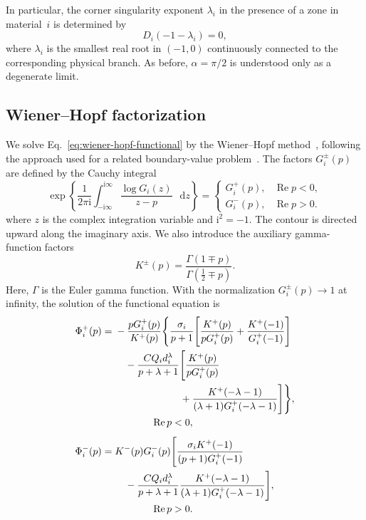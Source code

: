 \documentclass[pdflatex,iicol,sn-mathphys-ay]{sn-jnl}
\newcommand{\dd}{\mathop{}\!\mathrm{d}}
\newcommand{\ii}{\mathrm{i}}
\begin{document}
In particular, the corner singularity exponent $\lambda_i$ in the
presence of a zone in material~$i$ is determined by
\begin{equation*}
  D_i(-1-\lambda_i)=0,
\end{equation*}
where $\lambda_i$ is the smallest real root in $(-1,0)$ continuously
connected to the corresponding physical branch. As before,
$\alpha=\pi/2$ is understood only as a degenerate limit.

\subsection{Wiener--Hopf factorization}
\label{subsec:wiener-hopf}

We solve Eq.~\eqref{eq:wiener-hopf-functional} by the Wiener--Hopf
method~\citep{noble1958wienerhopf}, following the approach used for a related
boundary-value problem~\citep{KaminskyDudykPolishchuk2024}.
The factors $G_i^\pm(p)$ are defined by the Cauchy integral
{\footnotesize
\begin{equation*}
  \exp\left\{
    \frac{1}{2\pi\ii}
    \int_{-\ii\infty}^{\ii\infty}
      \frac{\log G_i(z)}{z-p}\,\dd z
  \right\}
  =
  \begin{cases}
    G_i^+(p), & \operatorname{Re}p<0,\\
    G_i^-(p), & \operatorname{Re}p>0.
  \end{cases}
\end{equation*}
}
where $z$ is the complex integration variable and $\ii^2=-1$.
The contour is directed upward along the imaginary axis. We also introduce
the auxiliary gamma-function factors
\begin{equation*}
  K^\pm(p)=
  \frac{\Gamma(1\mp p)}{\Gamma(\tfrac12\mp p)}.
\end{equation*}
Here, $\Gamma$ is the Euler gamma function.
With the normalization $G_i^\pm(p)\to1$ at infinity, the solution of
the functional equation is
{\small
\begin{equation}
\label{eq:wiener-hopf-solution}
\begin{aligned}
\Phi_i^+(p)={}&-\frac{pG_i^+(p)}{K^+(p)}
\Bigg\{
\frac{\sigma_i}{p+1}
\Bigg[
\frac{K^+(p)}{pG_i^+(p)}
+\frac{K^+(-1)}{G_i^+(-1)}
\Bigg]\\
&\quad
-\frac{CQ_i d_i^\lambda}{p+\lambda+1}
\Bigg[
\frac{K^+(p)}{pG_i^+(p)}\\
&\hspace{23mm}
+\frac{K^+(-\lambda-1)}
{(\lambda+1)G_i^+(-\lambda-1)}
\Bigg]
\Bigg\},\\[-1pt]
&\hspace{13mm}\operatorname{Re}p<0,\\[4pt]
\Phi_i^-(p)={}&K^-(p)G_i^-(p)
\Bigg[
\frac{\sigma_iK^+(-1)}
{(p+1)G_i^+(-1)}\\
&\quad
-\frac{CQ_i d_i^\lambda}{p+\lambda+1}
\frac{K^+(-\lambda-1)}
{(\lambda+1)G_i^+(-\lambda-1)}
\Bigg],\\[-1pt]
&\hspace{13mm}\operatorname{Re}p>0.
\end{aligned}
\end{equation}
}
\end{document}
